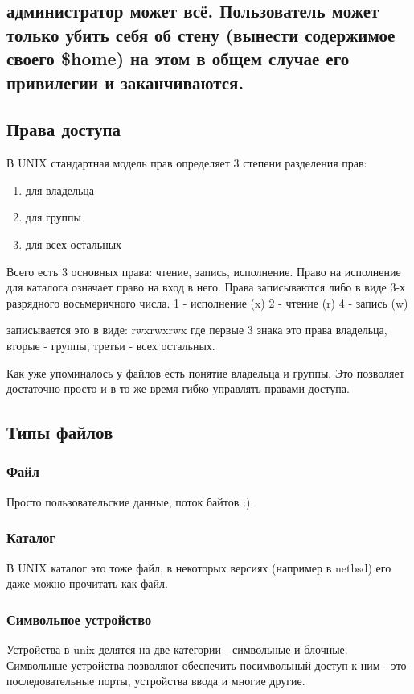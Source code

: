 \subsection{администратор может всё. Пользователь может только убить себя об стену (вынести содержимое своего \$home) на этом в общем случае его привилегии и заканчиваются.}
\subsection{Права доступа}
В UNIX стандартная модель прав определяет 3 степени разделения прав:
\begin{enumerate}
\item для владельца
\item для группы
\item для всех остальных
\end{enumerate}
Всего есть 3 основных права: чтение, запись, исполнение. Право на исполнение для каталога означает право на вход в него. Права записываются либо в виде 3-х разрядного восьмеричного числа.
1 - исполнение (x)
2 - чтение (r)
4 - запись (w)

записывается это в виде: rwxrwxrwx где первые 3 знака это права владельца, вторые - группы, третьи - всех остальных.

Как уже упоминалось у файлов есть понятие владельца и группы. Это позволяет достаточно просто и в то же время гибко управлять правами доступа.
\subsection{Типы файлов}
\subsubsection{Файл}
Просто пользовательские данные, поток байтов :).
\subsubsection{Каталог}
В UNIX каталог это тоже файл, в некоторых версиях (например в netbsd) его даже можно прочитать как файл.
\subsubsection{Символьное устройство}
Устройства в unix делятся на две категории - символьные и блочные. Символьные устройства позволяют обеспечить посимвольный доступ к ним - это последовательные порты, устройства ввода и многие другие. 

